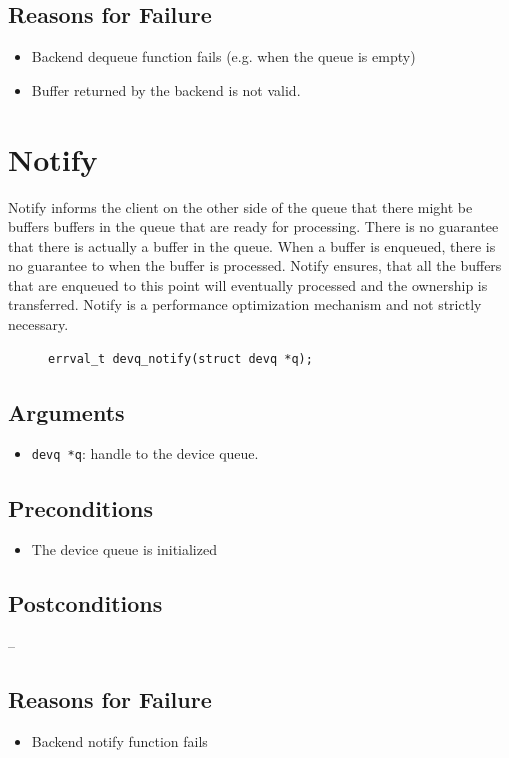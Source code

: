 \documentclass[a4paper,11pt,twoside]{report}
\begin{document}
	\subsection*{Reasons for Failure}
	\begin{itemize}
		\item Backend dequeue function fails (e.g. when the queue is empty)
		\item Buffer returned by the backend is not valid.
	\end{itemize}
	
	\section{Notify}
	Notify informs the client on the other side of the queue that there might be buffers 
	buffers in the queue that are ready for processing. There is no guarantee that there is 
	actually a buffer in the queue. When a buffer is enqueued, there
	is no guarantee to when the buffer is processed. Notify ensures, that
	all the buffers that are enqueued to this point will eventually processed and the ownership
	is transferred. Notify is a performance optimization mechanism and not strictly necessary.
	
	\begin{figure}[h]
		\begin{lstlisting}[style=code]
		errval_t devq_notify(struct devq *q);
		\end{lstlisting}
		\label{lst:notify}
	\end{figure}
	
	\subsection*{Arguments}
	\begin{itemize}
		\item \texttt{devq *q}: handle to the device queue.
	\end{itemize}
	\subsection*{Preconditions}
	\begin{itemize}
		\item The device queue is initialized
	\end{itemize}
	\subsection*{Postconditions}
	-- 
	\subsection*{Reasons for Failure}
	\begin{itemize}
		\item Backend notify function fails
	\end{itemize} 
	
\end{document}
